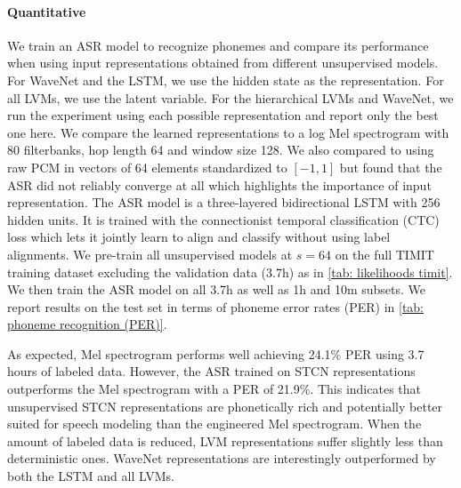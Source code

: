 \paragraph{Quantitative}
We train an ASR model to recognize phonemes and compare its performance when using input representations obtained from different unsupervised models. 
For WaveNet and the LSTM, we use the hidden state as the representation. For all LVMs, we use the latent variable. For the hierarchical LVMs and WaveNet, we run the experiment using each possible representation and report only the best one here. 
We compare the learned representations to a log Mel spectrogram with 80 filterbanks, hop length 64 and window size 128. 
We also compared to using raw PCM in vectors of 64 elements standardized to $[-1,1]$ but found that the ASR did not reliably converge at all which highlights the importance of input representation. 
The ASR model is a three-layered bidirectional LSTM with 256 hidden units. It is trained with the connectionist temporal classification (CTC) loss \cite{graves_connectionist_2006} which lets it jointly learn to align and classify without using label alignments. 
We pre-train all unsupervised models at $s=64$ on the full TIMIT training dataset excluding the validation data (3.7h) as in \cref{tab: likelihoods timit}. 
We then train the ASR model on all 3.7h as well as 1h and 10m subsets. We report results on the test set in terms of phoneme error rates (PER) in \cref{tab: phoneme recognition (PER)}. 

As expected, Mel spectrogram performs well achieving 24.1\% PER using 3.7 hours of labeled data. However, the ASR trained on STCN representations outperforms the Mel spectrogram with a PER of 21.9\%. 
This indicates that unsupervised STCN representations are phonetically rich and potentially better suited for speech modeling than the engineered Mel spectrogram. 
When the amount of labeled data is reduced, LVM representations suffer slightly less than deterministic ones. WaveNet representations are interestingly outperformed by both the LSTM and all LVMs. 



